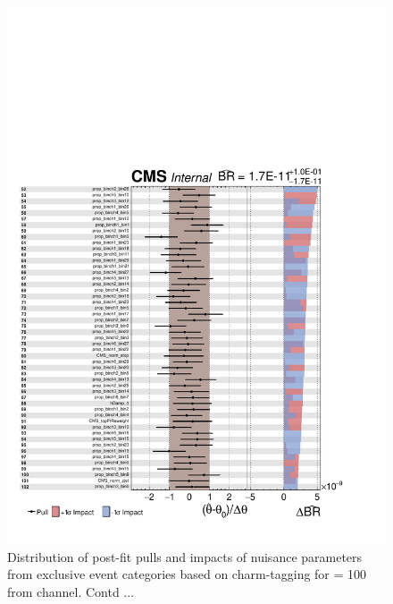 \begin{figure}
\begin{center}
\includegraphics[width=1.0\textwidth]{Image/MLFit/ImpactNuis/nuisImpact2.pdf}
 \caption{Distribution of post-fit pulls and impacts of nuisance 
     parameters from exclusive event categories based on charm-tagging 
     for \mHp = 100 \GeV from \ljets channel. Contd ...}
\label{fig:nuisImpact2}
\end{center}
\end{figure}

